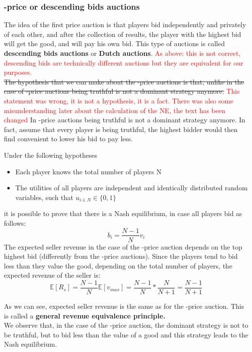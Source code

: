 \documentclass{article}
\begin{document}
\subsubsection{-price or descending bids auctions } The idea of the first price auction is that players bid independently and privately of each other, and after the collection of results, the player with the highest bid will get the good, and will pay his own bid. This type of auctions is called \textbf{descending bids auctions} or \textbf{Dutch auctions}. \textcolor{red}{As above: this is not correct, descending bids are technically different auctions but they are equivalent for our purposes.}\\
\sout{The hypothesis that we can make about the -price auctions is that, unlike in the case of -price auctions being truthful is not a dominant strategy anymore.} \textcolor{red}{This statement was wrong, it is not a hypothesis, it is a fact. There was also some misunderstanding later about the calculation of the NE, the text has been changed} In -price auctions being truthful is not a dominant strategy anymore. In fact, assume that every player is being truthful, the highest bidder would then find convenient to lower his bid to pay less. 

Under the following hypotheses
\begin{itemize}
	\item Each player knows the total number of players N 
	\item The utilities of all players are independent and identically distributed random variables, such that $u_{i \in N} \in \{0,1\}$
\end{itemize}
it is possible to prove that there is a Nash equilibrium, in case all players bid as follows: 
\begin{equation}
	b_i = \frac{N-1}{N} v_i 
\end{equation}
The expected seller revenue in the case of the -price auction depends on the top highest bid (differently from the -price auctions). Since the players tend to bid less than they value the good, depending on the total number of players, the expected revenue of the seller is: 
\begin{equation}
	\mathbb{E}[R_s] = \frac{N-1}{N}\mathbb{E}[v_{max}] = \frac{N-1}{N} * \frac{N}{N+1} = \frac{N-1}{N+1} 
\end{equation}

As we can see, expected seller revenue is the same as for the -price auction. This is called a \textbf{general revenue equivalence principle. }\\
We observe that, in the case of the -price auction, the dominant strategy is not to be truthful, but to bid less than the value of a good and this strategy leads to the Nash equilibrium. 
\end{document}
